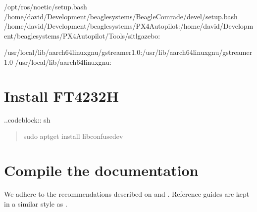 \documentclass[letterpaper,10pt,english]{sphinxmanual}
\begin{document}
\begin{sphinxVerbatim}[commandchars=\\\{\}]

 /opt/ros/noetic/setup.bash
 /home/david/Development/beaglesystems/BeagleComrade/devel/setup.bash
 /home/david/Development/beaglesystems/PX4\PYGZhy{}Autopilot:/home/david/Development/beaglesystems/PX4\PYGZhy{}Autopilot/Tools/sitl\PYGZus{}gazebo:


 /usr/local/lib/aarch64\PYGZhy{}linux\PYGZhy{}gnu/gstreamer\PYGZhy{}1.0:/usr/lib/aarch64\PYGZhy{}linux\PYGZhy{}gnu/gstreamer\PYGZhy{}1.0
 /usr/local/lib/aarch64\PYGZhy{}linux\PYGZhy{}gnu:
\end{sphinxVerbatim}


\section{Install FT4232H}
\label{\detokenize{source/howtos/install_ftdi4232h:install-ft4232h}}\label{\detokenize{source/howtos/install_ftdi4232h::doc}}
..code\sphinxhyphen{}block:: sh
\begin{quote}

sudo apt\sphinxhyphen{}get install libconfuse\sphinxhyphen{}dev
\end{quote}


\section{Compile the documentation}
\label{\detokenize{source/howtos/compile_documentation:compile-the-documentation}}\label{\detokenize{source/howtos/compile_documentation::doc}}
We adhere to the recommendations described on  and . Reference guides are kept in a similar style as .
\end{document}
